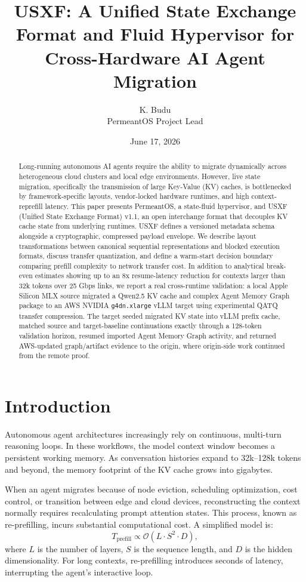 \documentclass[11pt]{article}
\title{USXF: A Unified State Exchange Format and Fluid Hypervisor for Cross-Hardware AI Agent Migration}
\author{K. Budu\\PermeantOS Project Lead}
\date{June 17, 2026}
\begin{document}
\maketitle

\begin{abstract}
Long-running autonomous AI agents require the ability to migrate dynamically across heterogeneous cloud clusters and local edge environments. However, live state migration, specifically the transmission of large Key-Value (KV) caches, is bottlenecked by framework-specific layouts, vendor-locked hardware runtimes, and high context-reprefill latency. This paper presents PermeantOS, a state-fluid hypervisor, and USXF (Unified State Exchange Format) v1.1, an open interchange format that decouples KV cache state from underlying runtimes. USXF defines a versioned metadata schema alongside a cryptographic, compressed payload envelope. We describe layout transformations between canonical sequential representations and blocked execution formats, discuss transfer quantization, and define a warm-start decision boundary comparing prefill complexity to network transfer cost. In addition to analytical break-even estimates showing up to an 8x resume-latency reduction for contexts larger than 32k tokens over 25 Gbps links, we report a real cross-runtime validation: a local Apple Silicon MLX source migrated a Qwen2.5 KV cache and complex Agent Memory Graph package to an AWS NVIDIA \texttt{g4dn.xlarge} vLLM target using experimental QATQ transfer compression. The target seeded migrated KV state into vLLM prefix cache, matched source and target-baseline continuations exactly through a 128-token validation horizon, resumed imported Agent Memory Graph activity, and returned AWS-updated graph/artifact evidence to the origin, where origin-side work continued from the remote proof.
\end{abstract}

\section{Introduction}

Autonomous agent architectures increasingly rely on continuous, multi-turn reasoning loops. In these workflows, the model context window becomes a persistent working memory. As conversation histories expand to 32k--128k tokens and beyond, the memory footprint of the KV cache grows into gigabytes.

When an agent migrates because of node eviction, scheduling optimization, cost control, or transition between edge and cloud devices, reconstructing the context normally requires recalculating prompt attention states. This process, known as re-prefilling, incurs substantial computational cost. A simplified model is:
\begin{equation}
T_{\text{prefill}} \propto \mathcal{O}(L \cdot S^2 \cdot D),
\end{equation}
where $L$ is the number of layers, $S$ is the sequence length, and $D$ is the hidden dimensionality. For long contexts, re-prefilling introduces seconds of latency, interrupting the agent's interactive loop.
\end{document}

